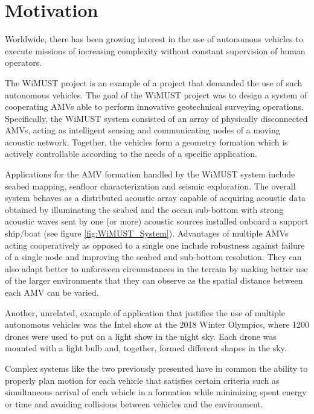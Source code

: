 \cleardoublepage%
\label{chap:intro}%



\section{Motivation}
 

\par Worldwide, there has been growing interest in the use of autonomous vehicles to execute missions of increasing complexity without constant supervision of human operators. 
\par The WiMUST project \cite{sonar_tec_overview} is an example of a project that demanded the use of such autonomous vehicles. The goal of the WiMUST project was to design a system of cooperating \acp{AMV} able to perform innovative geotechnical surveying operations. Specifically, the WiMUST system consisted of an array of physically disconnected \acp{AMV}, acting as intelligent sensing and communicating nodes of a moving acoustic network. Together, the vehicles form a geometry formation which is actively controllable according to the needs of a specific application. 
\par Applications for the \ac{AMV} formation handled by the WiMUST system include seabed mapping, seafloor characterization and seismic exploration. The overall system behaves as a distributed acoustic array capable of acquiring acoustic data obtained by illuminating the seabed and the ocean sub-bottom with strong acoustic waves sent by one (or more) acoustic sources installed onboard a support ship/boat (see figure \ref{fig:WiMUST_System}). Advantages of multiple \acp{AMV} acting cooperatively as opposed to a single one include robustness against failure of a single node and improving the seabed and sub-bottom resolution. They can also adapt better to unforeseen circumstances in the terrain by making better use of the larger environments that they can observe as the spatial distance between each \ac{AMV} can be varied. 
\par Another, unrelated, example of application that justifies the use of multiple autonomous vehicles was the Intel show at the 2018 Winter Olympics, where 1200 drones were used to put on a light show in the night sky. Each drone was mounted with a light bulb and, together, formed different shapes in the sky.
\par Complex systems like the two previously presented have in common the ability to properly plan motion for each vehicle that satisfies certain criteria such as simultaneous arrival of each vehicle in a formation while minimizing spent energy or time and avoiding collisions between vehicles and the environment.
